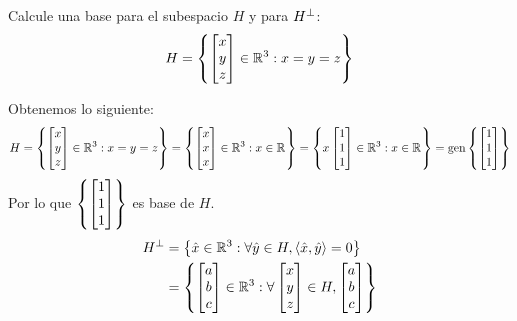\begin{exercise}
	Calcule una base para el subespacio $H$ y para $\mperp{H}$:
	\[  
		H =
		\set{
			\begin{bmatrix}
				x\\
				y\\
				z
			\end{bmatrix}
			\in\rmath[3]: x = y = z
		}
	\]
\end{exercise}
\begin{solution}
	Obtenemos lo siguiente:
	\begin{align*}
		H =\set{
		\begin{bmatrix}
			x\\
			y\\
			z
		\end{bmatrix}
		\in\rmath[3]: x = y = z
		}=\set{
		\begin{bmatrix}
			x\\
			x\\
			x
		\end{bmatrix}
		\in\rmath[3]: x\in\rmath
		}=\set{
		x
		\begin{bmatrix}
			1\\
			1\\
			1
		\end{bmatrix}
		\in\rmath[3]: x\in\rmath
		}=\mgen[1]{\set{
		\begin{bmatrix}
			1\\
			1\\
			1
		\end{bmatrix}
		}}
	\end{align*}
	Por lo que $\set{
		\begin{bmatrix}
			1\\
			1\\
			1
		\end{bmatrix}
	}$ es base de $H$.
	\begin{align*}
		\mperp{H} &=\set{\hat{x}\in\rmath[3]:\forall\hat{y}\in H,\inprod{\hat{x},\hat{y}} = 0}\\
		&=\set{
		\begin{bmatrix}
			a \\ b \\ c
		\end{bmatrix}
		\in\rmath[3]:\forall
		\begin{bmatrix}
			x \\ y \\ z
		\end{bmatrix}
		\in H,
		\begin{bmatrix}
			a \\ b \\ c

\end{bmatrix}}
\end{align*}
\end{solution}
